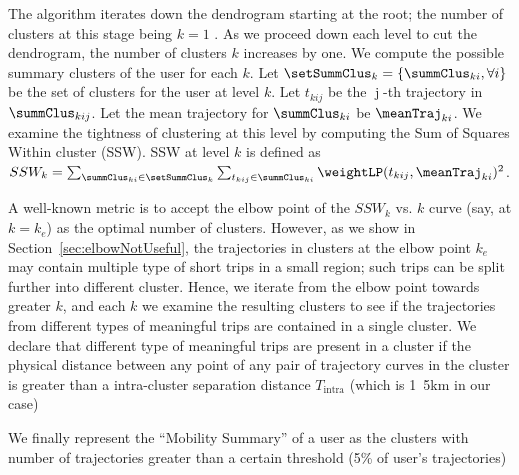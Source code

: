 
The algorithm iterates down the dendrogram starting at the root; the number of clusters at this stage being $k=1$ . As we proceed down each level to cut the dendrogram, the number of clusters $k$ increases by one. We compute the possible summary clusters of the user for each $k$. Let $\setSummClus_k =  \{ \summClus_{ki}, \forall i \}$ be the set of clusters for the user at level $k$. Let $t_{kij}$ be the $\operatorname{j}$-th trajectory in $\summClus_{kij}$. Let the mean trajectory for $\summClus_{ki}$ be $\meanTraj_{ki}$. We examine the tightness of clustering at this level by computing the Sum of Squares Within cluster (SSW). SSW at level $k$ is defined as $SSW_k=\sum_{\summClus_{ki} \in \setSummClus_k} \sum_{t_{kij} \in \summClus_{ki}} \weightLP(t_{kij},\meanTraj_{ki})^2$.

A well-known metric is to accept the elbow point of the $SSW_k$ vs. $k$ curve (say, at $k=k_e$) as the optimal number of clusters. However, as we show in Section~\ref{sec:elbowNotUseful}, the trajectories in clusters at the elbow point $k_e$ may contain multiple type of short trips in a small region; such trips can be split further into different cluster. Hence, we iterate from the elbow point towards greater $k$, and each $k$ we examine the resulting clusters to see if the trajectories from different types of meaningful trips are contained in a single cluster. We declare that different type of meaningful trips are present in a cluster if the physical distance between any point of any pair of trajectory curves in the cluster is greater than a intra-cluster separation distance $T_{\operatorname{intra}}$ (which is \unit{1.5}{km} in our case)%

We finally represent the ``Mobility Summary'' of a user as the clusters with number of trajectories greater than a certain threshold (5\% of user's trajectories)%


